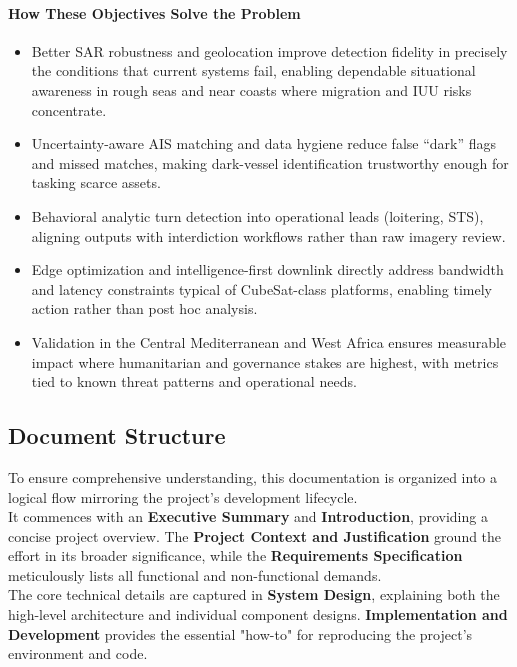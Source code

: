 \documentclass{article}
\begin{document}
	\paragraph{How These Objectives Solve the Problem}
	\begin{itemize}
		\item Better SAR robustness and geolocation improve detection fidelity in precisely the conditions that current systems fail, enabling dependable situational awareness in rough seas and near coasts where migration and IUU risks concentrate.
		\item 	Uncertainty-aware AIS matching and data hygiene reduce false “dark” flags and missed matches, making dark-vessel identification trustworthy enough for tasking scarce assets.
		\item Behavioral analytic turn detection into operational leads (loitering, STS), aligning outputs with interdiction workflows rather than raw imagery review.
		\item 	Edge optimization and intelligence-first downlink directly address bandwidth and latency constraints typical of CubeSat-class platforms, enabling timely action rather than post hoc analysis.
		\item 	Validation in the Central Mediterranean and West Africa ensures measurable impact where humanitarian and governance stakes are highest, with metrics tied to known threat patterns and operational needs.
	\end{itemize}
	
	\subsection{Document Structure}
	To ensure comprehensive understanding, this documentation is organized into a logical flow mirroring the project's development lifecycle. \\
	
	It commences with an \textbf{Executive Summary} and \textbf{Introduction}, providing a concise project overview. The \textbf{Project Context and Justification} ground the effort in its broader significance, while the \textbf{Requirements Specification} meticulously lists all functional and non-functional demands. \\
	
	The core technical details are captured in \textbf{System Design}, explaining both the high-level architecture and individual component designs. \textbf{Implementation and Development} provides the essential "how-to" for reproducing the project's environment and code. \\
	
\end{document}
